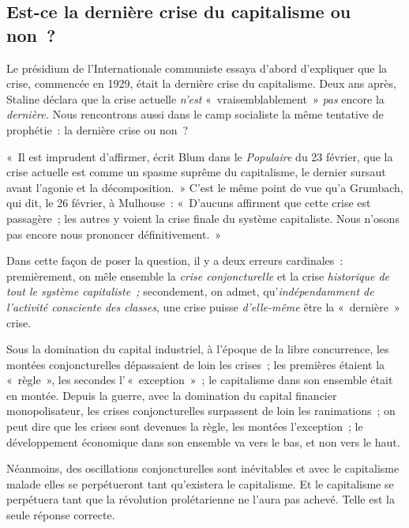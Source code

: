 \documentclass[french,twoside]{book} %
\begin{document}
\subsection[{Est-ce la dernière crise du capitalisme ou non ?}]{Est-ce la dernière crise du capitalisme ou non ?}
\noindent Le présidium de l’Internationale communiste essaya d’abord d’expliquer que la crise, commencée en 1929, était la dernière crise du capitalisme. Deux ans après, Staline  déclara que la crise actuelle \emph{n’est} « vraisemblablement » \emph{pas} encore la \emph{dernière.} Nous rencontrons aussi dans le camp socialiste la même tentative de prophétie : la dernière crise ou non ?\par
« Il est imprudent d’affirmer, écrit Blum dans le \emph{Populaire} du 23 février, que la crise actuelle est comme un spasme suprême du capitalisme, le dernier sursaut avant l’agonie et la décomposition. » C’est le même point de vue qu’a Grumbach, qui dit, le 26 février, à Mulhouse : « D’aucuns affirment que cette crise est passagère ; les autres y voient la crise finale du système capitaliste. Nous n’osons pas encore nous prononcer définitivement. »\par
Dans cette façon de poser la question, il y a deux erreurs cardinales : premièrement, on mêle ensemble la \emph{crise conjoncturelle} et la crise \emph{historique de tout le système capitaliste ;} secondement, on admet, qu’\emph{indépendamment de l’activité consciente des classes}, une crise puisse \emph{d’elle-même} être la « dernière » crise.\par
Sous la domination du capital industriel, à l’époque de la libre concurrence, les montées conjoncturelles dépassaient de loin les crises ; les premières étaient la « règle », les secondes l’ « exception » ; le capitalisme dans son ensemble était en montée. Depuis la guerre, avec la domination du capital financier monopolisateur, les crises conjoncturelles surpassent de loin les ranimations ; on peut dire que les crises sont devenues la règle, les montées l’exception ; le développement économique dans son ensemble va vers le bas, et non vers le haut.\par
Néanmoins, des oscillations conjoncturelles sont inévitables et avec le capitalisme malade elles se perpétueront tant qu’existera le capitalisme. Et le capitalisme se perpétuera tant que la révolution prolétarienne ne l’aura pas achevé. Telle est la seule réponse correcte.
\end{document}
